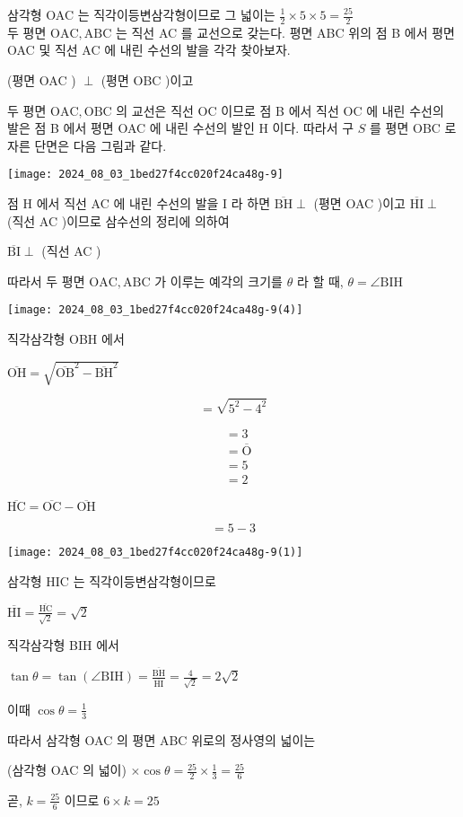 \documentclass[10pt]{article}
\begin{document}
삼각형 OAC 는 직각이등변삼각형이므로 그 넓이는 \(\frac{1}{2} \times 5 \times 5=\frac{25}{2}\)\\
두 평면 \(\mathrm{OAC}, \mathrm{ABC}\) 는 직선 AC 를 교선으로 갖는다. 평면 ABC 위의 점 B 에서 평면 OAC 및 직선 AC 에 내린 수선의 발을 각각 찾아보자.

(평면 OAC ) \(\perp\) (평면 OBC )이고

두 평면 \(\mathrm{OAC}, \mathrm{OBC}\) 의 교선은 직선 OC 이므로 점 B 에서 직선 OC 에 내린 수선의 발은 점 B 에서 평면 OAC 에 내린 수선의 발인 H 이다. 따라서 구 \(S\) 를 평면 OBC 로 자른 단면은 다음 그림과 같다.

\begin{center}
\texttt{[image: 2024\_08\_03\_1bed27f4cc020f24ca48g-9]}
\end{center}

점 H 에서 직선 AC 에 내린 수선의 발을 I 라 하면 \(\overline{\mathrm{BH}} \perp\) (평면 OAC )이고 \(\overline{\mathrm{HI}} \perp\) (직선 AC )이므로 삼수선의 정리에 의하여

\(\overline{\mathrm{BI}} \perp\) (직선 AC )

따라서 두 평면 \(\mathrm{OAC}, \mathrm{ABC}\) 가 이루는 예각의 크기를 \(\theta\) 라 할 때, \(\theta=\angle \mathrm{BIH}\)

\begin{center}
\texttt{[image: 2024\_08\_03\_1bed27f4cc020f24ca48g-9(4)]}
\end{center}

직각삼각형 OBH 에서

\(\overline{\mathrm{OH}}=\sqrt{\overline{\mathrm{OB}}^{2}-\overline{\mathrm{BH}}^{2}}\)

\[
=\sqrt{5^{2}-4^{2}}
\]

\[
\begin{aligned}
& =3 \\
& =\overline{\mathrm{O}} \\
& =5 \\
& =2
\end{aligned}
\]

\(\overline{\mathrm{HC}}=\overline{\mathrm{OC}}-\overline{\mathrm{OH}}\)

\[
=5-3
\]

\begin{center}
\texttt{[image: 2024\_08\_03\_1bed27f4cc020f24ca48g-9(1)]}
\end{center}

삼각형 HIC 는 직각이등변삼각형이므로

\(\overline{\mathrm{HI}}=\frac{\overline{\mathrm{HC}}}{\sqrt{2}}=\sqrt{2}\)

직각삼각형 BIH 에서

\(\tan \theta=\tan (\angle \mathrm{BIH})=\frac{\overline{\mathrm{BH}}}{\overline{\mathrm{HI}}}=\frac{4}{\sqrt{2}}=2 \sqrt{2}\)

이때 \(\cos \theta=\frac{1}{3}\)

따라서 삼각형 OAC 의 평면 ABC 위로의 정사영의 넓이는

(삼각형 OAC 의 넓이) \(\times \cos \theta=\frac{25}{2} \times \frac{1}{3}=\frac{25}{6}\)

곧, \(k=\frac{25}{6}\) 이므로 \(6 \times k=25\)
\end{document}
